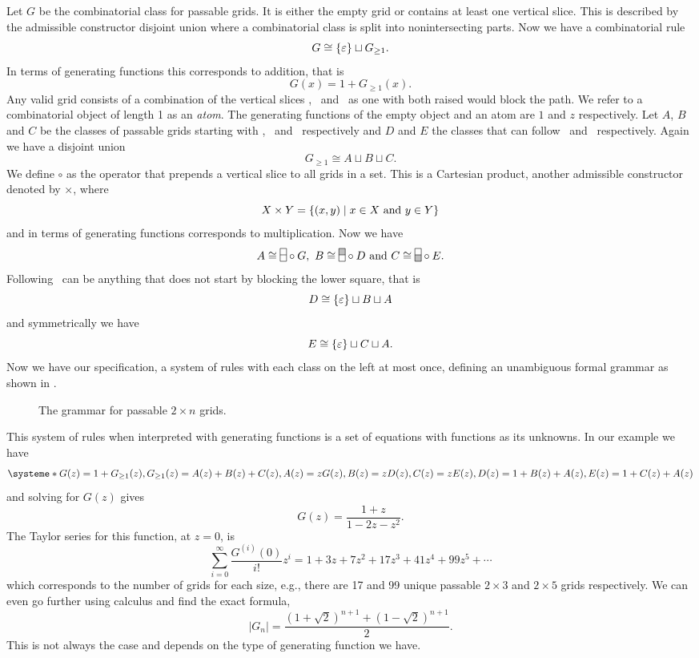 Let $G$ be the combinatorial class for passable grids. It is either the empty grid or contains at least one vertical slice. This is described by the admissible constructor disjoint union where a combinatorial class is split into nonintersecting parts. Now we have a combinatorial rule 
\[
    G \cong \left\{\varepsilon\right\} \sqcup G_{\geq 1}.
\]
In terms of generating functions this corresponds to addition, that is 
\[
    G(x) = 1 + G_{\geq1}(x).
\] 
Any valid grid consists of a combination of the vertical slices \gridN, \gridU\ and \gridD\ as one with both raised would block the path. We refer to a combinatorial object of length 1 as an \emph{atom}. The generating functions of the empty object and an atom are $1$ and $z$ respectively. Let $A$, $B$ and $C$ be the classes of passable grids starting with \gridN, \gridU\ and \gridD\ respectively and $D$ and $E$ the classes that can follow \gridU\ and \gridD\ respectively. Again we have a disjoint union 
\[
    G_{\geq1} \cong A \sqcup B \sqcup C.
\]
We define $\circ$ as the operator that prepends a vertical slice to all grids in a set. This is a Cartesian product, another admissible constructor denoted by $\times$, where
\[
X \times Y = \left\{(x,y) \mid x\in X \text{ and } y \in Y\right\}
\]
and in terms of generating functions corresponds to multiplication. Now we have 
\[
    A \cong \gridN \circ G, \ B \cong \gridU \circ D \text{ and } C \cong \gridD \circ E.
\]
Following \gridU\ can be anything that does not start by blocking the lower square, that is 
\[
    D \cong \left\{\varepsilon\right\} \sqcup B \sqcup A
\]
and symmetrically we have 
\[
    E \cong \left\{\varepsilon\right\} \sqcup C \sqcup A.
\]
Now we have our specification, a system of rules with each class on the left at most once, defining an unambiguous formal grammar as shown in .

\begin{figure}[ht!]
    \centering
    
    \caption{The grammar for passable $2\times n$ grids.}
    \label{fig:gridtree}
\end{figure}

This system of rules when interpreted with generating functions is a set of equations with functions as its unknowns. In our example we have
\[
    \systeme*{G(z) = 1 + G_{\geq1}(z), G_{\geq1}(z) = A(z) + B(z) + C(z),A(z) = zG(z), B(z) = zD(z), C(z) = zE(z), D(z) = 1+B(z)+A(z), E(z) = 1+C(z)+A(z)}
\]
and solving for $G(z)$ gives 
\[
    G(z) = \frac{1+z}{1-2z-z^2}.
\]
The Taylor series for this function, at $z=0$, is
\[
    \sum_{i=0}^\infty \frac{G^{(i)}(0)}{i!}z^i = 1+3z+7z^2+17z^3+ 41z^4 + 99z^5 + \dotsm
\]
which corresponds to the number of grids for each size, e.g., there are 17 and 99 unique passable $2\times3$ and $2\times5$ grids respectively. We can even go further using calculus and find the exact formula, 
\[
|G_n| = \frac{\left(1+\sqrt{2}\right)^{n+1} + \left(1-\sqrt{2}\right)^{n+1}}{2}.
\]
This is not always the case and depends on the type of generating function we have.

